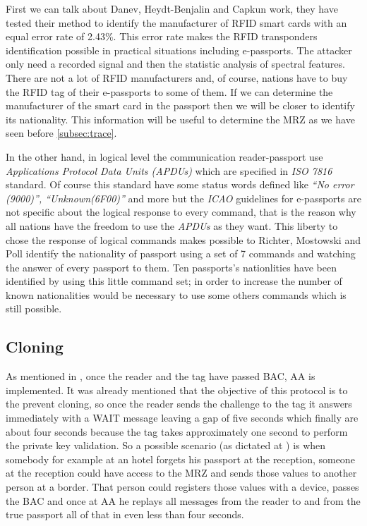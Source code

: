 \documentclass{acm_proc_article-sp}
\begin{document}
First we can talk about Danev, Heydt-Benjalin and Capkun \cite{05DABO2009} work, they have tested their method 
to identify the manufacturer of RFID smart cards with an equal error rate of 2.43\%. This error rate 
makes the RFID transponders identification possible in practical situations including e-passports. 
The attacker only need a recorded signal and then the statistic analysis of spectral features. 
There are not a lot of RFID manufacturers and, of course, nations have to buy the RFID tag of their 
e-passports to some of them. If we can determine the manufacturer of the smart card in the passport 
then we will be closer to identify its nationality. This information will be useful to determine the 
MRZ as we have seen before \ref{subsec:trace}.

In the other hand, in logical level the communication reader-passport use \textit{Applications Protocol 
Data Units (APDUs)} which are specified in \textit{ISO 7816} standard. Of course this standard have some status 
words defined like \textit{“No error (9000)”, “Unknown(6F00)”} and more but the \textit{ICAO} guidelines for 
e-passports are not specific about the logical response to every command, that is the reason why 
all nations have the freedom to use the \textit{APDUs} as they want. This liberty to chose the response of 
logical commands makes possible to Richter, Mostowski and Poll \cite{03HENN} identify the nationality of 
passport using a set of 7 commands and watching the answer of every passport to them. Ten passports's 
nationlities have been identified by using this little command set; in order to increase the number of 
known nationalities would be necessary to use some others commands which is still possible.


\subsection{Cloning}
As mentioned in \cite{MHTR07}, once the reader and the tag have passed BAC, AA is implemented. 
It was already mentioned that the objective of this protocol is to the prevent cloning, 
so once the reader sends the challenge to the tag it answers immediately with a 
WAIT message leaving a gap of five seconds which finally are about four seconds because the 
tag takes approximately one second to perform the private key validation. 
So a possible scenario (as dictated at \cite{MHTR07}) is when somebody for 
example at an hotel forgets his passport at the reception, someone at the reception 
could have access to the MRZ and sends those values to another person at a border. That person could registers those values with a 
device, passes the BAC and once at AA he replays all messages from the 
reader to and from the true passport all of that in even less than four seconds.
\end{document}
